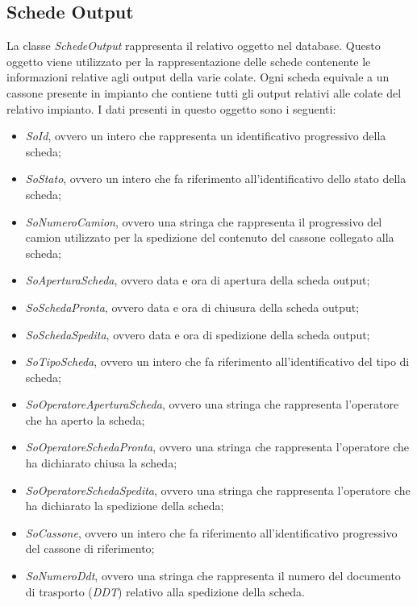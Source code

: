   \subsection{Schede Output}
  La classe \textit{SchedeOutput} rappresenta il relativo oggetto nel database. Questo oggetto viene utilizzato per la
  rappresentazione delle schede contenente le informazioni relative agli output della varie colate. Ogni scheda equivale
  a un cassone presente in impianto che contiene tutti gli output relativi alle colate del relativo impianto. I dati
  presenti in questo oggetto sono i seguenti:
  \begin{itemize}
    \item \textit{SoId}, ovvero un intero che rappresenta un identificativo progressivo della scheda;
    \item \textit{SoStato}, ovvero un intero che fa riferimento all'identificativo dello stato della scheda;
    \item \textit{SoNumeroCamion}, ovvero una stringa che rappresenta il progressivo del camion utilizzato per la spedizione
    del contenuto del cassone collegato alla scheda;
    \item \textit{SoAperturaScheda}, ovvero data e ora di apertura della scheda output;
    \item \textit{SoSchedaPronta}, ovvero data e ora di chiusura della scheda output;
    \item \textit{SoSchedaSpedita}, ovvero data e ora di spedizione della scheda output;
    \item \textit{SoTipoScheda}, ovvero un intero che fa riferimento all'identificativo del tipo di scheda;
    \item \textit{SoOperatoreAperturaScheda}, ovvero una stringa che rappresenta l'operatore che ha aperto la scheda;
    \item \textit{SoOperatoreSchedaPronta}, ovvero una stringa che rappresenta l'operatore che ha dichiarato chiusa la scheda;
    \item \textit{SoOperatoreSchedaSpedita}, ovvero una stringa che rappresenta l'operatore che ha dichiarato la
    spedizione della scheda;
    \item \textit{SoCassone}, ovvero un intero che fa riferimento all'identificativo progressivo del cassone di riferimento;
    \item \textit{SoNumeroDdt}, ovvero una stringa che rappresenta il numero del documento di trasporto (\textit{DDT}) relativo
    alla spedizione della scheda.
  \end{itemize}

